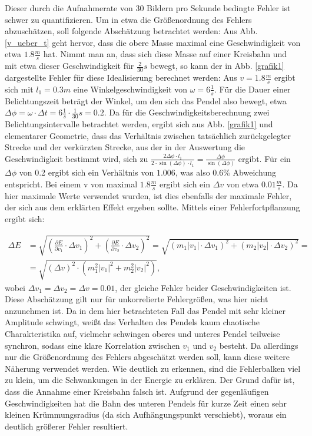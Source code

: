 Dieser durch die Aufnahmerate von 30 Bildern pro Sekunde bedingte Fehler ist schwer zu quantifizieren. Um in etwa die Größenordnung 
des Fehlers abzuschätzen, soll folgende Abschätzung betrachtet werden: 
Aus Abb. \ref{v_ueber_t} geht hervor, dass die obere Masse maximal eine Geschwindigkeit von etwa $1.8 \frac{m}{s} $ hat. Nimmt man an, 
dass sich diese Masse auf einer Kreisbahn und mit etwa dieser Geschwindigkeit für $\frac{2}{30} s$ bewegt, so kann der in 
Abb. \ref{grafik1} dargestellte Fehler für diese Idealisierung berechnet werden: 
Aus $ v = 1.8 \frac{m}{s} $ ergibt sich mit $ l_1 = 0.3 m$ eine Winkelgeschwindigkeit von $ \omega = 6 \frac{1}{s} $. Für die Dauer
einer Belichtungszeit beträgt der Winkel, um den sich das Pendel also bewegt, etwa $ \Delta \phi = \omega \cdot \Delta t = 6 \frac{1}{s} \cdot \frac{1}{30} s = 0.2$. 
Da für die Geschwindigkeitsberechnung zwei Belichtungsintervalle betrachtet werden, ergibt sich aus Abb. \ref{grafik1} und elementarer 
Geometrie, dass das Verhältnis zwischen tatsächlich zurückgelegter Strecke und der verkürzten Strecke, aus der in der Auswertung die Geschwindigkeit bestimmt 
wird, sich zu $ \frac{2 \Delta \phi \cdot l_1}{2 \cdot \sin(\Delta \phi) \cdot l_1} = \frac{\Delta \phi}{\sin(\Delta \phi)} $
ergibt. Für ein $\Delta \phi $ von 0.2 ergibt sich ein Verhältnis von $1.006$, was also $0.6 \% $ Abweichung entspricht. Bei einem v von maximal $1.8 \frac{m}{s} $ ergibt sich ein $\Delta v $ von etwa $0.01 \frac{m}{s} $.  
Da hier maximale Werte verwendet wurden, ist dies ebenfalls der maximale Fehler, der sich aus dem erklärten Effekt ergeben sollte. 
Mittels einer Fehlerfortpflanzung ergibt sich: 

\begin{align}
\Delta E &= \sqrt{(\frac{\partial E}{\partial v_1} \cdot \Delta v_1)^2 + (\frac{\partial E}{\partial v_2} \cdot \Delta v_2)^2} = \sqrt{(m_1 |v_1| \cdot \Delta v_1)^2 + (m_2 |v_2| \cdot \Delta v_2)^2}= \nonumber \\ &= \sqrt{(\Delta v)^2 \cdot (m_1^2 |v_1|^2 + m_2^2 |v_2|^2)}, 
\end{align}
wobei $ \Delta v_1 = \Delta v_2 = \Delta v  = 0.01$, der gleiche Fehler beider Geschwindigkeiten ist. Diese Abschätzung gilt nur für unkorrelierte Fehlergrößen, was hier nicht anzunehmen ist. Da in dem hier betrachteten Fall das Pendel mit sehr kleiner Amplitude schwingt, weißt das Verhalten des Pendels kaum chaotische Charakteristika auf, vielmehr schwingen oberes und unteres Pendel teilweise synchron, sodass eine klare Korrelation zwischen $v_1 $ und $v_2$ besteht. Da allerdings nur die Größenordnung des Fehlers abgeschätzt werden soll, kann diese weitere Näherung verwendet werden. 
Wie deutlich zu erkennen, sind die Fehlerbalken viel zu klein, um die Schwankungen in der Energie zu erklären. Der Grund dafür ist, dass die Annahme einer Kreisbahn falsch ist. Aufgrund der gegenläufigen Geschwindigkeiten hat die Bahn des unteren Pendels für kurze Zeit einen sehr kleinen Krümmungsradius (da sich Aufhängungspunkt verschiebt), woraus ein deutlich größerer Fehler resultiert. 

